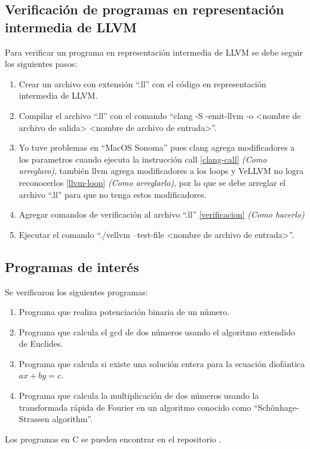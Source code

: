 \documentclass{hw-template}
\begin{document}
\subsection{Verificación de programas en representación intermedia de LLVM}
Para verificar un programa en representación intermedia de LLVM se debe seguir los siguientes pasos:
\begin{enumerate}
    \item Crear un archivo con extensión ``.ll'' con el código en representación intermedia de LLVM.
    \item Compilar el archivo ``.ll'' con el comando ``clang -S -emit-llvm -o <nombre de archivo de salida> <nombre de archivo de entrada>''.
    \item Yo tuve problemas en ``MacOS Sonoma'' pues clang agrega modificadores a los parametros cuando ejecuta la instrucción call \ref{clang-call}{\color{blue} \textit{(Como arreglaro)}}, también llvm agrega modificadores a los loops y VeLLVM no logra reconocerlos \ref{llvm-loop}{\color{blue} \textit{(Como arreglarlo)}}, por lo que se debe arreglar el archivo ``.ll'' para que no tenga estos modificadores.
    \item Agregar comandos de verificación al archivo ``.ll'' \ref{verificacion}{\color{blue} \textit{(Como hacerlo)}}
    \item Ejecutar el comando ``./vellvm --test-file <nombre de archivo de entrada>''.
\end{enumerate}

\subsection{Programas de interés}
Se verificaron los siguientes programas:
\begin{enumerate}
    \item Programa que realiza potenciación binaria de un número.
    \item Programa que calcula el gcd de dos números usando el algoritmo extendido de Euclides.
    \item Programa que calcula si existe una solución entera para la ecuación diofántica $ax + by = c$.
    \item Programa que calcula la multiplicación de dos números usando la transformada rápida de Fourier en un algoritmo conocido como ``Schönhage-Strassen algorithm''.
\end{enumerate}
Los programas en C se pueden encontrar en el repositorio \cite{repo}.
\end{document}

